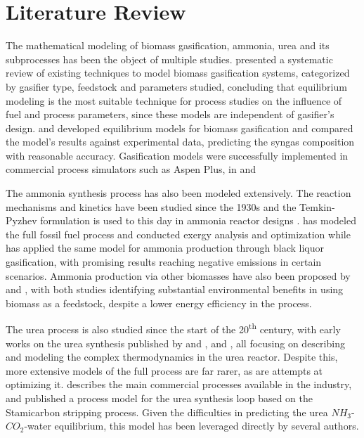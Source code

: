 \documentclass[a4paper, titlepage]{article}
\begin{document}
\section{Literature Review}

The mathematical modeling of biomass gasification, ammonia, urea and its subprocesses has been the object of multiple
studies. \textcite{baruahModelingBiomassGasification2014} presented a systematic review of  existing techniques to model
biomass gasification systems, categorized by gasifier type, feedstock and parameters studied,
concluding that equilibrium modeling is the most suitable technique for process studies on the influence of fuel and
process parameters, since these models are independent of gasifier's design.
\textcite{gambarottaNonstoichiometricEquilibriumModel2018} and \textcite{azzoneDevelopmentEquilibriumModel2012} developed
equilibrium models for biomass gasification and compared the model’s results against experimental data, predicting the
syngas composition with reasonable accuracy. Gasification models were successfully implemented in commercial process
simulators such as Aspen Plus, in \textcite{hanModelingDowndraftBiomass2017} and
\textcite{ramzanSimulationHybridBiomass2011}

The ammonia synthesis process has also been modeled extensively. The reaction mechanisms and kinetics have been
studied since the 1930s \cite{gillespieThermodynamicTreatmentChemical1930} and the Temkin-Pyzhev formulation is
used to this day in ammonia reactor designs \cite{temkinKineticsAmmoniaSynthesis1940}
\cite{singhSimulationAmmoniaSynthesis1979} \cite{nielsenAmmoniaCatalysisManufacture1995}.
\textcite{florez-orregoProcessSynthesisOptimization2018} has modeled the full fossil fuel process and conducted
exergy analysis and optimization while \textcite{domingosExergyEnvironmentalAnalysis2021} has applied the same model
for ammonia production through black liquor gasification, with promising results reaching negative emissions in
certain scenarios. Ammonia production via other biomasses have also been proposed by
\textcite{florez-orregoComparativeExergyEconomic2019} and \textcite{tunaTechnoeconomicAssessmentNonfossil2014}, with
both studies identifying substantial environmental benefits in using biomass as a feedstock, despite a lower energy
efficiency in the process.

The urea process is also studied since the start of the 20\textsuperscript{th} century, with early works on the
urea synthesis published by \textcite{frejacquesBasesTheoriquesSynthese1948} and
\textcite{kawasumiEquilibriumCO2NH3UreaH2OSystem1953}, and \textcite{islaSimulationUreaSynthesis1993}, all focusing
on describing and modeling the complex thermodynamics in the urea reactor. Despite this, more extensive models of
the full process are far rarer, as are attempts at optimizing it.
\textcite{meessenUreaSynthesis2014} describes the main commercial processes available in the industry, and
\textcite{aspentechASPEN88Technical2011} published a process model for the urea synthesis loop based on the
Stamicarbon stripping process. Given the difficulties in predicting the urea $NH_3$-$CO_2$-water equilibrium, this
model has been leveraged directly by several authors.
\end{document}
